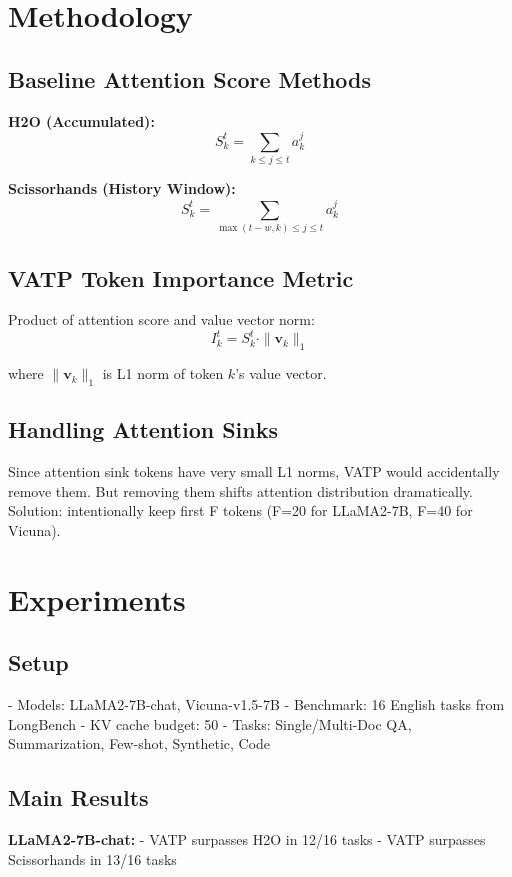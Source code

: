 \section{Methodology}

\subsection{Baseline Attention Score Methods}
\textbf{H2O (Accumulated):}
\begin{equation}
S_k^t = \sum_{k \leq j \leq t} a_k^j
\end{equation}

\textbf{Scissorhands (History Window):}
\begin{equation}
S_k^t = \sum_{\max(t-w, k) \leq j \leq t} a_k^j
\end{equation}

\subsection{VATP Token Importance Metric}
Product of attention score and value vector norm:
\begin{equation}
I_k^t = S_k^t \cdot \|\mathbf{v}_k\|_1
\end{equation}

where $\|\mathbf{v}_k\|_1$ is L1 norm of token $k$'s value vector.

\subsection{Handling Attention Sinks}
Since attention sink tokens have very small L1 norms, VATP would accidentally remove them. But removing them shifts attention distribution dramatically. Solution: intentionally keep first F tokens (F=20 for LLaMA2-7B, F=40 for Vicuna).

\section{Experiments}

\subsection{Setup}
- Models: LLaMA2-7B-chat, Vicuna-v1.5-7B
- Benchmark: 16 English tasks from LongBench
- KV cache budget: 50%
- Tasks: Single/Multi-Doc QA, Summarization, Few-shot, Synthetic, Code

\subsection{Main Results}
\textbf{LLaMA2-7B-chat:}
- VATP surpasses H2O in 12/16 tasks
- VATP surpasses Scissorhands in 13/16 tasks

